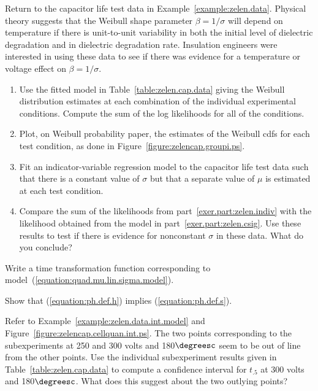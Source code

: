\begin{exercise} 
Return to the capacitor life test data in
Example~\ref{example:zelen.data}.  Physical theory suggests that the
Weibull shape parameter $\beta=1/\sigma$ will depend on temperature if
there is unit-to-unit variability in both the initial level of
dielectric degradation and in dielectric degradation rate. Insulation
engineers were interested in using these data to see if there was
evidence for a temperature or voltage effect on $\beta=1/\sigma$.
\begin{enumerate}
\item
\label{exer.part:zelen.indiv}
Use the fitted model 
in Table~\ref{table:zelen.cap.data} giving the Weibull
distribution estimates at each combination of the individual
experimental conditions. Compute the sum of the log likelihoods for all
of the conditions.
\item
Plot, on Weibull probability paper, the estimates of the Weibull cdfs
for each test condition, as done in
Figure~\ref{figure:zelencap.groupi.ps}.
\item
\label{exer.part:zelen.csig}
Fit an indicator-variable regression model to the capacitor life test data
such that there is a constant value of $\sigma$ but that
a separate value of $\mu$ is estimated at each test condition.
\item
Compare the sum of the likelihoods from
part~\ref{exer.part:zelen.indiv} with the likelihood obtained from the
model in part~\ref{exer.part:zelen.csig}. Use these results to test
if there is evidence for nonconstant $\sigma$ in these data.
What do you conclude?
\end{enumerate}
\end{exercise}

\begin{exercise1}
Write a time transformation function corresponding to
model~(\ref{equation:quad.mu.lin.sigma.model}).
\end{exercise1}

\begin{exercise1} 
Show that (\ref{equation:ph.def.h}) implies (\ref{equation:ph.def.s}).
\end{exercise1}

\begin{exercise}
Refer to Example~\ref{example:zelen.data.int.model} and
Figure~\ref{figure:zelencap.cellquan.int.ps}.  The two points
corresponding to the subexperiments at 250 and 300 volts and
180$\degreesc$ seem to be out of line from the other points. Use the
individual subexperiment results given in
Table~\ref{table:zelen.cap.data} to compute a confidence interval for
$t_{.5}$ at 300 volts and 180$\degreesc$.  What does this suggest
about the two outlying points?
\end{exercise}

